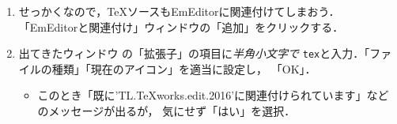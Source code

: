 \documentclass{ltjsarticle}
\begin{document}
\begin{enumerate}
\begin{enumerate}
  \item せっかくなので，\TeX ソースもEmEditorに関連付けてしまおう．
    「EmEditorと関連付け」ウィンドウの「追加」をクリックする．

  \item 出てきたウィンドウ%
    の「拡張子」の項目に\emph{半角小文字で}
    \texttt{tex}と入力．「ファイルの種類」「現在のアイコン」を適当に設定し，
    「OK」．
    \begin{itemize}
    \item このとき「既に'TL.TeXworks.edit.2016'に関連付けられています」などのメッセージが出るが，
      気にせず「はい」を選択．
    \end{itemize}
  \end{enumerate}
\end{enumerate}
\end{document}
